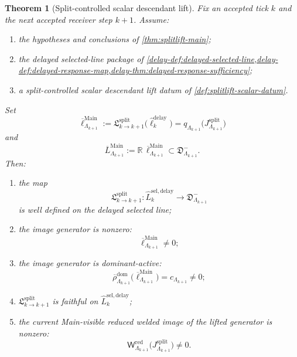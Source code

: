\documentclass[11pt]{article}
\theoremstyle{definition}
\theoremstyle{plain}
\newtheorem{theorem}[definition]{Theorem}
\theoremstyle{remark}
\newcommand{\1}{\mathbf 1}
\begin{document}
\begin{theorem}[Split-controlled scalar descendant lift]
\label{thm:splitlift-scalar-descendant-lift}
Fix an accepted tick \(k\) and the next accepted receiver step \(k+1\).
Assume:
\begin{enumerate}[leftmargin=2em]
\item the hypotheses and conclusions of \cref{thm:splitlift-main};
\item the delayed selected-line package of
  \cref{delay-def:delayed-selected-line,delay-def:delayed-response-map,delay-thm:delayed-response-sufficiency};
\item a split-controlled scalar descendant lift datum of
  \cref{def:splitlift-scalar-datum}.
\end{enumerate}
Set
\[
\overline\ell^{\mathrm{Main}}_{\Lambda_{k+1}}
:=
\mathfrak L^{\mathrm{split}}_{k\to k+1}
\bigl(\widehat\ell^{\mathrm{delay}}_k\bigr)
=
q_{\Lambda_{k+1}}\!\bigl(J^{\mathrm{split}}_{\Lambda_{k+1}}\bigr)
\]
and
\[
\overline L^{\mathrm{Main}}_{\Lambda_{k+1}}
:=
\mathbb R\,\overline\ell^{\mathrm{Main}}_{\Lambda_{k+1}}
\subset
\mathfrak D^-_{\Lambda_{k+1}}.
\]
Then:
\begin{enumerate}[leftmargin=2em]
\item the map
  \[
  \mathfrak L^{\mathrm{split}}_{k\to k+1}:
  \widehat L^{\mathrm{sel,delay}}_k\to \mathfrak D^-_{\Lambda_{k+1}}
  \]
  is well defined on the delayed selected line;
\item the image generator is nonzero:
  \[
  \overline\ell^{\mathrm{Main}}_{\Lambda_{k+1}}\neq 0;
  \]
\item the image generator is dominant-active:
  \[
  \overline{\rho}^{\mathrm{dom}}_{\Lambda_{k+1}}
  \bigl(
  \overline\ell^{\mathrm{Main}}_{\Lambda_{k+1}}
  \bigr)
  =
  c_{\Lambda_{k+1}}
  \neq 0;
  \]
\item \(\mathfrak L^{\mathrm{split}}_{k\to k+1}\) is faithful on
  \(\widehat L^{\mathrm{sel,delay}}_k\);
\item the current Main-visible reduced welded image of the lifted generator is nonzero:
  \[
  \mathsf W^{\mathrm{red}}_{\Lambda_{k+1}}
  \!\bigl(J^{\mathrm{split}}_{\Lambda_{k+1}}\bigr)
  \neq 0.
  \]
\end{enumerate}
\end{theorem}
\end{document}
